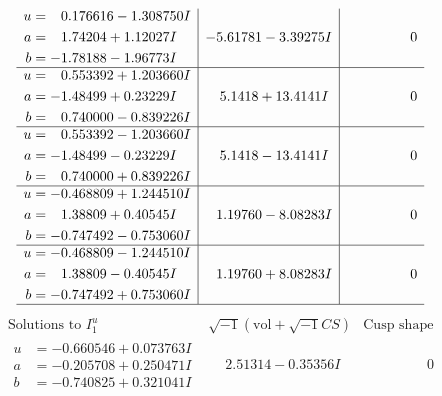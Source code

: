 \documentclass[1p]{elsarticle_modified}
\theoremstyle{definition}
\newcommand{\I}{\sqrt{-1}}
\begin{document}
$$\begin{array}{c|c|c}
\begin{aligned}
u &= \phantom{-}0.176616 - 1.308750 I \\
a &= \phantom{-}1.74204 + 1.12027 I \\
b &= -1.78188 - 1.96773 I\end{aligned}
 & -5.61781 - 3.39275 I & \phantom{-0.000000 } 0 \\ \hline\begin{aligned}
u &= \phantom{-}0.553392 + 1.203660 I \\
a &= -1.48499 + 0.23229 I \\
b &= \phantom{-}0.740000 - 0.839226 I\end{aligned}
 & \phantom{-}5.1418 + 13.4141 I & \phantom{-0.000000 } 0 \\ \hline\begin{aligned}
u &= \phantom{-}0.553392 - 1.203660 I \\
a &= -1.48499 - 0.23229 I \\
b &= \phantom{-}0.740000 + 0.839226 I\end{aligned}
 & \phantom{-}5.1418 - 13.4141 I & \phantom{-0.000000 } 0 \\ \hline\begin{aligned}
u &= -0.468809 + 1.244510 I \\
a &= \phantom{-}1.38809 + 0.40545 I \\
b &= -0.747492 - 0.753060 I\end{aligned}
 & \phantom{-}1.19760 - 8.08283 I & \phantom{-0.000000 } 0 \\ \hline\begin{aligned}
u &= -0.468809 - 1.244510 I \\
a &= \phantom{-}1.38809 - 0.40545 I \\
b &= -0.747492 + 0.753060 I\end{aligned}
 & \phantom{-}1.19760 + 8.08283 I & \phantom{-0.000000 } 0\\
 \hline 
 \end{array}$$\newpage$$\begin{array}{c|c|c}  
\text{Solutions to }I^u_{1}& \I (\text{vol} + \sqrt{-1}CS) & \text{Cusp shape}\\
 \hline 
\begin{aligned}
u &= -0.660546 + 0.073763 I \\
a &= -0.205708 + 0.250471 I \\
b &= -0.740825 + 0.321041 I\end{aligned}
 & \phantom{-}2.51314 - 0.35356 I & \phantom{-0.000000 } 0 \\ \hline\begin{aligned}

\end{aligned}
\end{array}$$
\end{document}
